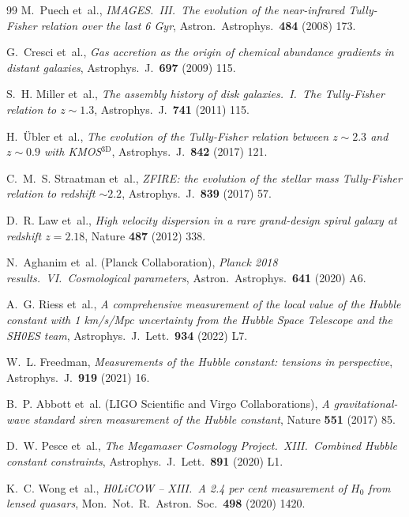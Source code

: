 \documentclass[a4paper,11pt]{article}
\begin{document}
\begin{thebibliography}{99}
M.~Puech et~al.,
\emph{IMAGES.\ III.\ The evolution of the near-infrared Tully-Fisher relation over the last 6 Gyr},
Astron.\ Astrophys.\ \textbf{484} (2008) 173.

G.~Cresci et~al.,
\emph{Gas accretion as the origin of chemical abundance gradients in distant galaxies},
Astrophys.\ J.\ \textbf{697} (2009) 115.

S.~H. Miller et~al.,
\emph{The assembly history of disk galaxies.\ I.\ The Tully-Fisher relation to $z \sim 1.3$},
Astrophys.\ J.\ \textbf{741} (2011) 115.

H.~\"{U}bler et~al.,
\emph{The evolution of the Tully-Fisher relation between $z \sim 2.3$ and $z \sim 0.9$ with KMOS$^{\mathrm{3D}}$},
Astrophys.\ J.\ \textbf{842} (2017) 121.

C.~M.~S. Straatman et~al.,
\emph{ZFIRE: the evolution of the stellar mass Tully-Fisher relation to redshift $\sim 2.2$},
Astrophys.\ J.\ \textbf{839} (2017) 57.

D.~R. Law et~al.,
\emph{High velocity dispersion in a rare grand-design spiral galaxy at redshift $z = 2.18$},
Nature \textbf{487} (2012) 338.

N.~Aghanim et~al. (Planck Collaboration),
\emph{Planck 2018 results.\ VI.\ Cosmological parameters},
Astron.\ Astrophys.\ \textbf{641} (2020) A6.

A.~G. Riess et~al.,
\emph{A comprehensive measurement of the local value of the Hubble constant with 1 km/s/Mpc uncertainty from the Hubble Space Telescope and the SH0ES team},
Astrophys.\ J.\ Lett.\ \textbf{934} (2022) L7.

W.~L. Freedman,
\emph{Measurements of the Hubble constant: tensions in perspective},
Astrophys.\ J.\ \textbf{919} (2021) 16.

B.~P. Abbott et~al. (LIGO Scientific and Virgo Collaborations),
\emph{A gravitational-wave standard siren measurement of the Hubble constant},
Nature \textbf{551} (2017) 85.

D.~W. Pesce et~al.,
\emph{The Megamaser Cosmology Project.\ XIII.\ Combined Hubble constant constraints},
Astrophys.\ J.\ Lett.\ \textbf{891} (2020) L1.

K.~C. Wong et~al.,
\emph{H0LiCOW -- XIII.\ A 2.4 per cent measurement of $H_0$ from lensed quasars},
Mon.\ Not.\ R.\ Astron.\ Soc.\ \textbf{498} (2020) 1420.

\end{thebibliography}
\end{document}
